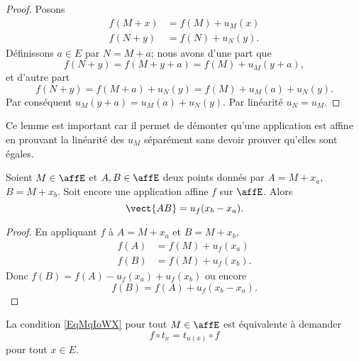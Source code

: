 \begin{proof}
    Posons
    \begin{subequations}
        \begin{align}
            f(M+x)&=f(M)+u_M(x)\\
            f(N+y)&=f(N)+u_N(y).
        \end{align}
    \end{subequations}
    Définissons \( a\in E\) par \( N=M+a\); nous avons d'une part que
    \begin{equation}
        f(N+y)=f(M+y+a)=f(M)+u_M(y+a),
    \end{equation}
    et d'autre part
    \begin{equation}
        f(N+y)=f(M+a)+u_N(y)=f(M)+u_M(a)+u_N(y).
    \end{equation}
    Par conséquent \( u_M(y+a)=u_M(a)+u_N(y)\). Par linéarité \( u_N=u_M\).
\end{proof}
Ce lemme est important car il permet de démonter qu'une application est affine en prouvant la linéarité des \( u_M\) séparément sans devoir prouver qu'elles sont égales.

\begin{lemma}       \label{LEMooXXTPooKYFGGM}
    Soient \( M\in \affE\) et \( A,B\in \affE\) deux points donnés par \( A=M+x_a\), \( B=M+x_b\). Soit encore une application affine \( f\) sur \( \affE\). Alors
    \begin{equation}
        \vect{ AB }=u_f(x_b-x_a).
    \end{equation}
\end{lemma}

\begin{proof}
    En appliquant \( f\) à \( A=M+x_a\) et \( B=M+x_b\),
    \begin{subequations}
        \begin{align}
            f(A)&=f(M)+u_f(x_a)\\
            f(B)&=f(M)+u_f(x_b).
        \end{align}
    \end{subequations}
    Donc \( f(B)=f(A)-u_f(x_a)+u_f(x_b)\) ou encore
    \begin{equation}
        f(B)=f(A)+u_f(x_b-x_a).
    \end{equation}
\end{proof}

\begin{remark}
    La condition \eqref{EqMqIoWX} pour tout \( M\in\affE\) est équivalente à demander
    \begin{equation}
        f\circ t_x=t_{u(x)}\circ f
    \end{equation}
    pour tout \( x\in E\).
\end{remark}


